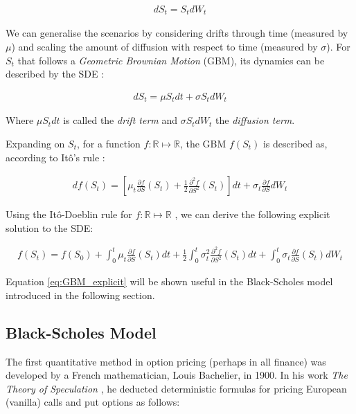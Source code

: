 \begin{align*}
dS_t = S_t dW_t
\end{align*}

We can generalise the scenarios by considering drifts through time (measured by $\mu$) and scaling the amount of diffusion with respect to time (measured by $\sigma$). For $S_t$ that follows a \textit{Geometric Brownian Motion} (GBM), its dynamics can be described by the SDE \cite{Shreve2004}:

\begin{align*}
dS_t = \mu S_t dt + \sigma S_t dW_t
\end{align*}

Where $\mu S_t dt$ is called the \textit{drift term} and $\sigma S_t dW_t$ the \textit{diffusion term}.

Expanding on $S_t$, for a function $f:\mathbb{R}\mapsto\mathbb{R}$, the GBM $f(S_t)$ is described as, according to Itô's rule \cite{Shreve2004}:

\begin{align*}
df(S_t) = \left[\mu_t\frac{\partial f}{\partial S}(S_t)+\frac{1}{2}\frac{\partial^2 f}{\partial S^2}(S_t)\right]dt + \sigma_t\frac{\partial f}{\partial S}dW_t
\end{align*}

Using the Itô-Doeblin rule for $f:\mathbb{R}\mapsto\mathbb{R}$ \cite{Shreve2004}, we can derive the following explicit solution to the SDE:

\begin{align} \label{eq:GBM_explicit}
f(S_t) = f(S_0) + \int_{0}^{t}{\mu_t\frac{\partial f}{\partial S}(S_t)}dt + \frac{1}{2}\int_{0}^{t}{\sigma_t^2\frac{\partial^2 f}{\partial S^2}(S_t)}dt + \int_{0}^{t}{\sigma_t\frac{\partial f}{\partial S}(S_t)}dW_t
\end{align}

Equation \ref{eq:GBM_explicit} will be shown useful in the Black-Scholes model introduced in the following section.

\subsection{Black-Scholes Model}

The first quantitative method in option pricing (perhaps in all finance) was developed by a French mathematician, Louis Bachelier, in 1900. In his work \textit{The Theory of Speculation} \cite{Bachelier1900}, he deducted deterministic formulas for pricing European (vanilla) calls and put options as follows:

